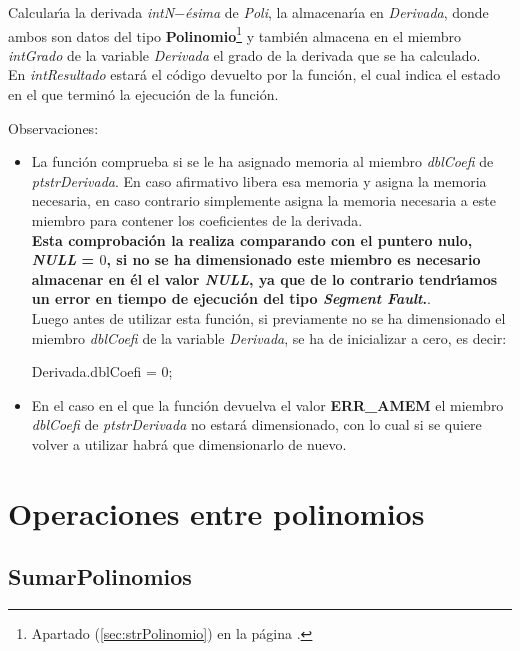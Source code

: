 Calcular\'{\i}a la derivada \emph{intN$-$\'esima} de \emph{Poli}, 
la almacenar\'{\i}a en \emph{Derivada}, donde ambos son datos del
tipo \textbf{Polinomio}\footnote{Apartado (\ref{sec:strPolinomio}) en la
p\'agina \pageref{sec:strPolinomio}.} y tambi\'en almacena en el miembro
\emph{intGrado} de la variable \emph{Derivada} el grado de la derivada que
se ha calculado.\\

En \emph{intResultado} estar\'a el c\'odigo devuelto por la funci\'on, el cual
indica el estado en el que termin\'o la ejecuci\'on de la funci\'on.\newline

Observaciones:

\begin{itemize}
\item La funci\'on comprueba si se le ha asignado memoria al miembro 
\emph{dblCoefi} de \emph{ptstrDerivada}. En caso afirmativo libera esa
memoria y asigna la memoria necesaria, en caso contrario simplemente asigna
la memoria necesaria a este miembro para contener los coeficientes de la
derivada.\\

\textbf{Esta comprobaci\'on la realiza comparando con el puntero nulo, 
\emph{NULL} = $0$, si no se ha dimensionado este miembro es necesario almacenar
en \'el el valor \emph{NULL}, ya que de lo contrario tendr\'{\i}amos un error
en tiempo de ejecuci\'on del tipo \emph{Segment Fault}.}.\\

Luego antes de utilizar esta funci\'on, si previamente no se ha dimensionado
el miembro \emph{dblCoefi} de la variable \emph{Derivada}, se ha de inicializar
a cero, es decir:

\begin{center}
Derivada.dblCoefi = 0;
\end{center}
\item En el caso en el que la funci\'on devuelva el valor \textbf{ERR\_AMEM} el
miembro \emph{dblCoefi} de \emph{ptstrDerivada} no estar\'a dimensionado, con lo
cual si se quiere volver a utilizar habr\'a que dimensionarlo de nuevo.
\end{itemize}

\section{Operaciones entre polinomios}

\subsection{SumarPolinomios}

